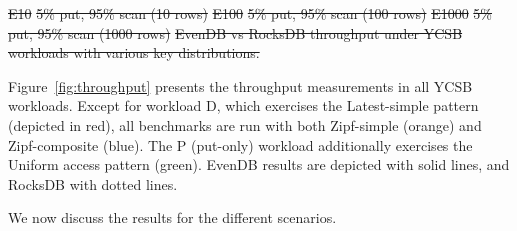 \documentclass[sigplan,10pt]{acmart}
\newcommand{\sys}{EvenDB}
\providecommand{\DIFdel}[1]{{\protect\color{red}\sout{#1}}}                      %
\providecommand{\DIFdelend}{} %
\providecommand{\DIFdelFL}[1]{\DIFdel{#1}} %
\begin{document}
{%
\DIFdelFL{E10 }%
\DIFdelFL{5\% put, 95\% scan (10 rows)}}
{%
\DIFdelFL{E100 }%
\DIFdelFL{5\% put, 95\% scan (100 rows)}}
{%
\DIFdelFL{E1000 }%
\DIFdelFL{5\% put, 95\% scan (1000 rows)}}
{%
\DIFdelFL{\sys\/ vs RocksDB throughput under YCSB workloads with various key distributions.}%
}

\DIFdelend Figure~\ref{fig:throughput} presents the throughput measurements in all YCSB workloads. 
Except for workload D, which exercises the Latest-simple pattern
(depicted in red), all benchmarks are run with both  Zipf-simple (orange) 
and Zipf-composite (blue). The P (put-only) workload 
additionally exercises the Uniform access pattern (green). \sys\/ results are depicted with solid
lines, and RocksDB with dotted lines. 

We now discuss the results for the different scenarios.
\end{document}
